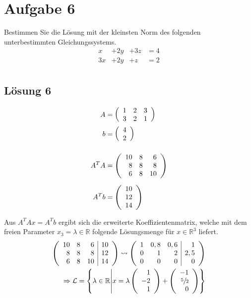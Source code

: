 \documentclass[main.tex]{subfiles}
\begin{document}
\section{Aufgabe 6}
Bestimmen Sie die Lösung mit der kleinsten Norm des folgenden unterbestimmten Gleichungssystems.
\begin{equation*}
\begin{array}{rrrr}
     x &+ 2y &+ 3z &= 4 \\
    3x &+ 2y &+ z  &= 2 \\
\end{array}
\end{equation*}

\subsection{Lösung 6}
\begin{align*}
    A &= \eqmatrix{rrr}{1 & 2 & 3 \\ 3 & 2 & 1} \\
    b &= \eqmatrix{r}{4 \\ 2} \\[4mm]
    A^T A &= \eqmatrix{rrr}{10 & 8 & 6 \\ 8 & 8 & 8 \\ 6 & 8 & 10} \\[2mm]
    A^T b &= \eqmatrix{r}{10 \\ 12 \\ 14} \\
\end{align*}

Aus $A^TA x = A^Tb$ ergibt sich die erweiterte Koeffizientenmatrix, welche mit dem freien Parameter $x_3 = \lambda \in \mathbb{R}$ folgende Lösungsmenge für $x \in \mathbb{R}^3$ liefert.
\begin{align*}
    \eqmatrix{rrr|r}{
        10 & 8 &  6 & 10 \\
         8 & 8 &  8 & 12 \\
         6 & 8 & 10 & 14
    } \leadsto
    \eqmatrix{rrr|r}{
        1 & 0,8 & 0,6 & 1 \\
        0 &   1 &   2 & 2,5 \\
        0 &   0 &   0 & 0
    }\\ \Rightarrow \mathcal{L} = \left\{
        \lambda \in \mathbb{R}
        \middle|
        x = \lambda \eqmatrix{r}{1 \\ -2 \\ 1} + \eqmatrix{r}{-1 \\ \sfrac{5}{2} \\ 0} \right\}
\end{align*}
\end{document}
